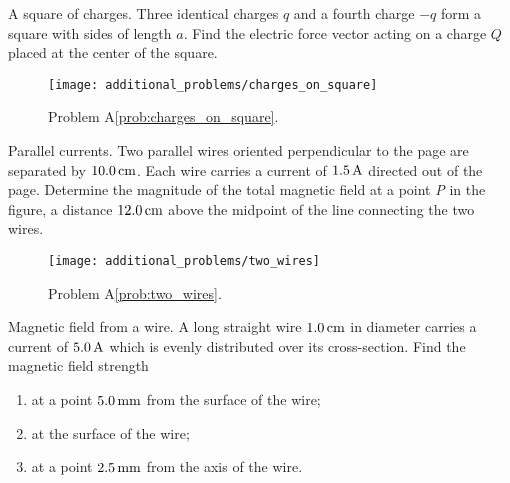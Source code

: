 \begin{aproblem}{A square of charges.}
  Three identical charges $q$ and a fourth charge $-q$ form a square
  with sides of length $a$.  Find the electric force vector acting on
  a charge $Q$ placed at the center of the square.
  \label{prob:charges_on_square}

  \begin{figure}[h]
    \begin{center}
      \texttt{[image: additional\_problems/charges\_on\_square]}
    \end{center}
    \caption{Problem A\ref{prob:charges_on_square}.}
  \end{figure}
\end{aproblem}

\newpage

\begin{aproblem}{Parallel currents.}
  Two parallel wires oriented perpendicular to the page are separated
  by $10.0\,\mbox{cm}$.  Each wire carries a current of $1.5\,\mbox{A}$
  directed out of the page.  Determine the magnitude of the total
  magnetic field at a point {\em P} in the figure, a distance
  $12.0\,\mbox{cm}$ above the midpoint of the line connecting the two
  wires.
  \label{prob:two_wires}
  \begin{figure}[h]
    \begin{center}
      \texttt{[image: additional\_problems/two\_wires]}
    \end{center}
    \caption{Problem A\ref{prob:two_wires}.}
  \end{figure}
\end{aproblem}


\begin{aproblem}{Magnetic field from a wire.}
  A long straight wire $1.0\,\mbox{cm}$ in diameter carries a current
  of $5.0\,\mbox{A}$ which is evenly distributed over its
  cross-section.  Find the magnetic field strength
  \begin{enumerate}
  \item at a point $5.0\,\mbox{mm}$ from the surface of the wire;
  \item at the surface of the wire;
  \item at a point $2.5\,\mbox{mm}$ from the axis of the wire.	
  \end{enumerate}
  \label{prob:ampere_wire}
\end{aproblem}


